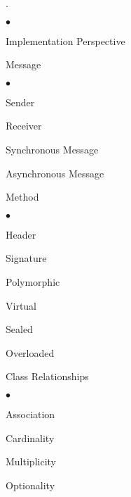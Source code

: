 \documentclass[11pt]{article}
\begin{document}
{\begin{list}{.}
\begin{list}{$\bullet$}{\itemsep 0.01in \parskip 0in \parsep 0in}
    \item Implementation Perspective

    \end{list}


\item Message

    \begin{list}{$\bullet$}{\itemsep 0.01in \parskip 0in \parsep 0in}

    \item Sender

    \item Receiver

    \item Synchronous Message

    \item Asynchronous Message

    \end{list}

\item Method

    \begin{list}{$\bullet$}{\itemsep 0.01in \parskip 0in \parsep 0in}

        \item Header

        \item Signature

        \item Polymorphic

        \item Virtual

        \item Sealed

        \item Overloaded


    \end{list}

\item Class Relationships

    \begin{list}{$\bullet$}{\itemsep 0.01in \parskip 0in \parsep 0in}

        \item Association

        \item Cardinality

        \item Multiplicity

        \item Optionality


\end{list}
\end{list}}
\end{document}
